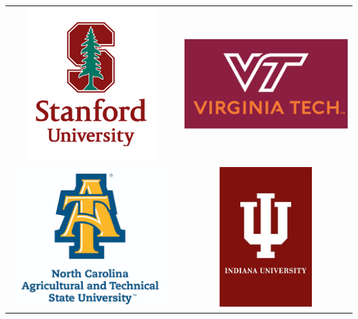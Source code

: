 \documentclass[landscape,paperwidth=70in,paperheight=46in,fontscale=0.225]{baposter} %
\begin{document}
\begin{poster}
{ 
\begin{tabular}{c c}
\includegraphics[scale=0.4]{logos/stanford.png} &
\includegraphics[scale=0.4]{logos/vt.png} \\
\includegraphics[scale=0.4]{logos/ncatnt.png} &
\includegraphics[scale=0.4]{logos/iu.png} \\
\end{tabular}
}


\end{poster}
\end{document}
